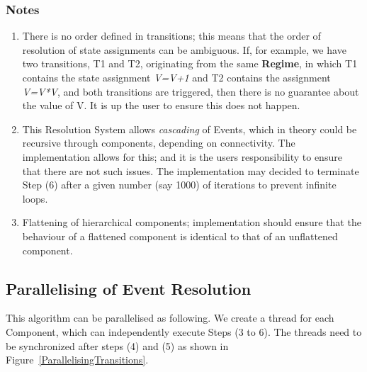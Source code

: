 \documentclass{article}
\newcommand{\Regime}{{\bf{Regime}}\xspace}
\begin{document}
\subsubsection{Notes}

\begin{enumerate}
\item  There is no order defined in transitions; this means
that the order of resolution of state assignments can be ambiguous. If, for
example, we have two transitions, T1 and T2, originating from the same \Regime,
in which T1 contains the state assignment \textsl{V=V+1} and T2 contains the
assignment \textsl{V=V*V}, and both transitions are triggered, then there is no
guarantee about the value of V. It is up the user to ensure this does not
happen.

\item This Resolution System allows \emph{cascading} of Events, which in theory
could be recursive through components, depending on connectivity. The
implementation allows for this; and it is the users responsibility to ensure
that there are not such issues. The implementation may decided to terminate
Step (6) after a given number (say 1000) of iterations to prevent infinite
loops.

\item Flattening of hierarchical components; implementation should ensure that
the behaviour of a flattened component is identical to that of an unflattened
component.
\end{enumerate}

\subsection{Parallelising of Event Resolution}

This algorithm can be parallelised as following. We create a thread for each
Component, which can independently execute Steps (3 to 6). The threads need
to be synchronized after steps (4) and (5) as shown in
Figure~\ref{ParallelisingTransitions}.
\end{document}
